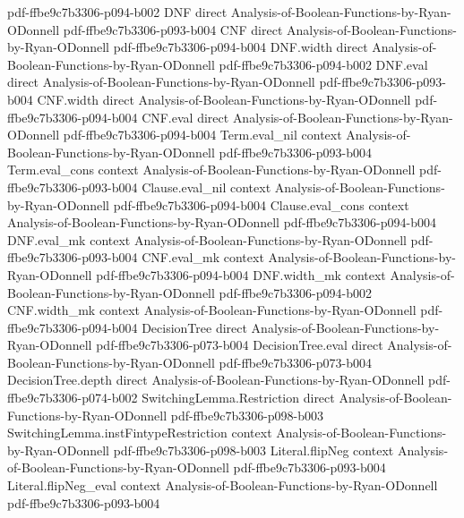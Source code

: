 \begin{theorem}
  {pdf-ffbe9c7b3306-p094-b002}
\proofstep
  {DNF}
  {direct}
  {Analysis-of-Boolean-Functions-by-Ryan-ODonnell}
  {pdf-ffbe9c7b3306-p093-b004}
\proofstep
  {CNF}
  {direct}
  {Analysis-of-Boolean-Functions-by-Ryan-ODonnell}
  {pdf-ffbe9c7b3306-p094-b004}
\proofstep
  {DNF.width}
  {direct}
  {Analysis-of-Boolean-Functions-by-Ryan-ODonnell}
  {pdf-ffbe9c7b3306-p094-b002}
\proofstep
  {DNF.eval}
  {direct}
  {Analysis-of-Boolean-Functions-by-Ryan-ODonnell}
  {pdf-ffbe9c7b3306-p093-b004}
\proofstep
  {CNF.width}
  {direct}
  {Analysis-of-Boolean-Functions-by-Ryan-ODonnell}
  {pdf-ffbe9c7b3306-p094-b004}
\proofstep
  {CNF.eval}
  {direct}
  {Analysis-of-Boolean-Functions-by-Ryan-ODonnell}
  {pdf-ffbe9c7b3306-p094-b004}
\proofstep
  {Term.eval_nil}
  {context}
  {Analysis-of-Boolean-Functions-by-Ryan-ODonnell}
  {pdf-ffbe9c7b3306-p093-b004}
\proofstep
  {Term.eval_cons}
  {context}
  {Analysis-of-Boolean-Functions-by-Ryan-ODonnell}
  {pdf-ffbe9c7b3306-p093-b004}
\proofstep
  {Clause.eval_nil}
  {context}
  {Analysis-of-Boolean-Functions-by-Ryan-ODonnell}
  {pdf-ffbe9c7b3306-p094-b004}
\proofstep
  {Clause.eval_cons}
  {context}
  {Analysis-of-Boolean-Functions-by-Ryan-ODonnell}
  {pdf-ffbe9c7b3306-p094-b004}
\proofstep
  {DNF.eval_mk}
  {context}
  {Analysis-of-Boolean-Functions-by-Ryan-ODonnell}
  {pdf-ffbe9c7b3306-p093-b004}
\proofstep
  {CNF.eval_mk}
  {context}
  {Analysis-of-Boolean-Functions-by-Ryan-ODonnell}
  {pdf-ffbe9c7b3306-p094-b004}
\proofstep
  {DNF.width_mk}
  {context}
  {Analysis-of-Boolean-Functions-by-Ryan-ODonnell}
  {pdf-ffbe9c7b3306-p094-b002}
\proofstep
  {CNF.width_mk}
  {context}
  {Analysis-of-Boolean-Functions-by-Ryan-ODonnell}
  {pdf-ffbe9c7b3306-p094-b004}
\proofstep
  {DecisionTree}
  {direct}
  {Analysis-of-Boolean-Functions-by-Ryan-ODonnell}
  {pdf-ffbe9c7b3306-p073-b004}
\proofstep
  {DecisionTree.eval}
  {direct}
  {Analysis-of-Boolean-Functions-by-Ryan-ODonnell}
  {pdf-ffbe9c7b3306-p073-b004}
\proofstep
  {DecisionTree.depth}
  {direct}
  {Analysis-of-Boolean-Functions-by-Ryan-ODonnell}
  {pdf-ffbe9c7b3306-p074-b002}
\proofstep
  {SwitchingLemma.Restriction}
  {direct}
  {Analysis-of-Boolean-Functions-by-Ryan-ODonnell}
  {pdf-ffbe9c7b3306-p098-b003}
\proofstep
  {SwitchingLemma.instFintypeRestriction}
  {context}
  {Analysis-of-Boolean-Functions-by-Ryan-ODonnell}
  {pdf-ffbe9c7b3306-p098-b003}
\proofstep
  {Literal.flipNeg}
  {context}
  {Analysis-of-Boolean-Functions-by-Ryan-ODonnell}
  {pdf-ffbe9c7b3306-p093-b004}
\proofstep
  {Literal.flipNeg_eval}
  {context}
  {Analysis-of-Boolean-Functions-by-Ryan-ODonnell}
  {pdf-ffbe9c7b3306-p093-b004}

\end{theorem}
